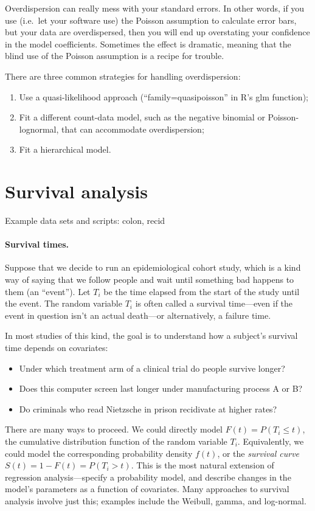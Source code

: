 \documentclass[11pt]{article}
\newcommand{\1}[1]{\mathbf{1}_{\{ {#1} \}}}
\begin{document}
Overdispersion can really mess with your standard errors.  In other words, if you use (i.e.~let your software use) the Poisson assumption to calculate error bars, but your data are overdispersed, then you will end up overstating your confidence in the model coefficients.  Sometimes the effect is dramatic, meaning that the blind use of the Poisson assumption is a recipe for trouble.

There are three common strategies for handling overdispersion:
\begin{enumerate}
\item Use a quasi-likelihood approach (``family=quasipoisson'' in R's glm function);
\item Fit a different count-data model, such as the negative binomial or Poisson-lognormal, that can accommodate overdispersion;
\item Fit a hierarchical model.
\end{enumerate}


\section{Survival analysis}
Example data sets and scripts: colon, recid

\paragraph{Survival times.} Suppose that we decide to run an epidemiological cohort study, which is a kind way of saying that we follow people and wait until something bad happens to them (an ``event'').  Let $T_i$ be the time elapsed from the start of the study until the event.  The random variable $T_i$ is often called a survival time---even if the event in question isn't an actual death---or alternatively, a failure time.

In most studies of this kind, the goal is to understand how a subject's survival time depends on covariates:
\begin{itemize}
\item Under which treatment arm of a clinical trial do people survive longer?
\item Does this computer screen last longer under manufacturing process A or B?
\item Do criminals who read Nietzsche in prison recidivate at higher rates?
\end{itemize}

There are many ways to proceed.  We could directly model $F(t) = P(T_i \leq t)$, the cumulative distribution function of the random variable $T_i$.  Equivalently, we could model the corresponding probability density $f(t)$, or the \textit{survival curve} $S(t) = 1 - F(t) = P(T_i > t)$.  This is the most natural extension of regression analysis---specify a probability model, and describe changes in the model's parameters as a function of covariates.  Many approaches to survival analysis involve just this; examples include the Weibull, gamma, and log-normal.
\end{document}

